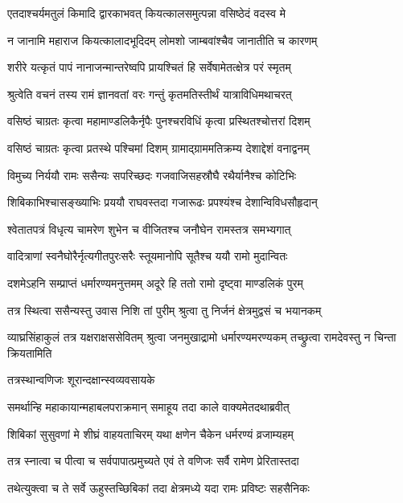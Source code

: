 \twolineshloka
{एतदाश्चर्यमतुलं किमादि द्वारकाभवत्}
{कियत्कालसमुत्पन्ना वसिष्ठेदं वदस्व मे}%


\twolineshloka
{न जानामि महाराज कियत्कालादभूदिदम्}
{लोमशो जाम्बवांश्चैव जानातीति च कारणम्}%

\twolineshloka
{शरीरे यत्कृतं पापं नानाजन्मान्तरेष्वपि}
{प्रायश्चितं हि सर्वेषामेतत्क्षेत्र परं स्मृतम्}%

\twolineshloka
{श्रुत्वेति वचनं तस्य रामं ज्ञानवतां वरः}
{गन्तुं कृतमतिस्तीर्थं यात्राविधिमथाचरत्}%

\twolineshloka
{वसिष्ठं चाग्रतः कृत्वा महामाण्डलिकैर्नृपैः}
{पुनश्चरविधिं कृत्वा प्रस्थितश्चोत्तरां दिशम्}%

\twolineshloka
{वसिष्ठं चाग्रतः कृत्वा प्रतस्थे पश्चिमां दिशम्}
{ग्रामाद्ग्राममतिक्रम्य देशाद्देशं वनाद्वनम्}%

\twolineshloka
{विमुच्य निर्ययौ रामः ससैन्यः सपरिच्छदः}
{गजवाजिसहस्रौघै रथैर्यानैश्च कोटिभिः}%

\twolineshloka
{शिबिकाभिश्चासङ्ख्याभिः प्रययौ राघवस्तदा}
{गजारूढः प्रपश्यंश्च देशान्विविधसौहृदान्}%

\twolineshloka
{श्वेतातपत्रं विधृत्य चामरेण शुभेन च}
{वीजितश्च जनौघेन रामस्तत्र समभ्यगात्}%

\twolineshloka
{वादित्राणां स्वनैघोरैर्नृत्यगीतपुरःसरैः}
{स्तूयमानोपि सूतैश्च ययौ रामो मुदान्वितः}%

\twolineshloka
{दशमेऽहनि सम्प्राप्तं धर्मारण्यमनुत्तमम्}
{अदूरे हि ततो रामो दृष्ट्वा माण्डलिकं पुरम्}%

\twolineshloka
{तत्र स्थित्वा ससैन्यस्तु उवास निशि तां पुरीम्}
{श्रुत्वा तु निर्जनं क्षेत्रमुद्वसं च भयानकम्}%

\threelineshloka
{व्याघ्रसिंहाकुलं तत्र यक्षराक्षससेवितम्}
{श्रुत्वा जनमुखाद्रामो धर्मारण्यमरण्यकम्}
{तच्छ्रुत्वा रामदेवस्तु न चिन्ता क्रियतामिति}%

\onelineshloka
{तत्रस्थान्वणिजः शूरान्दक्षान्स्वव्यवसायके}%

\twolineshloka
{समर्थान्हि महाकायान्महाबलपराक्रमान्}
{समाहूय तदा काले वाक्यमेतदथाब्रवीत्}%

\twolineshloka
{शिबिकां सुसुवणां मे शीघ्रं वाहयताचिरम्}
{यथा क्षणेन चैकेन धर्मरण्यं व्रजाम्यहम्}%

\twolineshloka
{तत्र स्नात्वा च पीत्वा च सर्वपापात्प्रमुच्यते}
{एवं ते वणिजः सर्वै रामेण प्रेरितास्तदा}%

\twolineshloka
{तथेत्युक्त्वा च ते सर्वे ऊहुस्तच्छिबिकां तदा}
{क्षेत्रमध्ये यदा रामः प्रविष्टः सहसैनिकः}%

